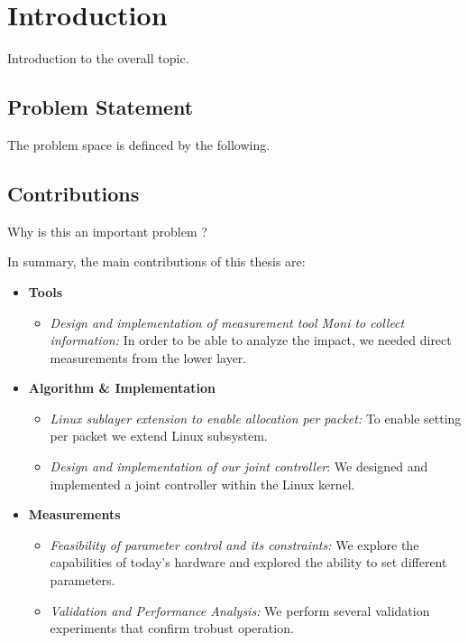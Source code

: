 \chapter{Introduction}
\label{chap:introduction}

Introduction to the overall topic.

\section{Problem Statement}
\label{sec:intro:probstatement}

The problem space is definced by the following.

\section{Contributions}
\label{sec:intro:contrib}


Why is this an important problem ?
%

In summary, the main contributions of this thesis are:

\begin{itemize}
\item{\bf Tools}
  \begin{itemize}
    \item {\it Design and implementation of measurement tool \textit{Moni} to collect information:} In order to be able to analyze the impact, we needed direct measurements from the lower layer.
  \end{itemize}
\item {\bf Algorithm \& Implementation}
 	\begin{itemize}
    	\item {\it Linux sublayer extension to enable allocation per packet:} To enable setting per packet we extend Linux subsystem.
    	\item {\it Design and implementation of our joint controller}: We designed and implemented a joint controller within the Linux kernel.
	\end{itemize}
\item {\bf Measurements}
  \begin{itemize}
      \item {\it Feasibility of parameter control and its constraints:} We explore the capabilities of today's hardware and explored the ability to set different parameters.
	    \item {\it Validation and Performance Analysis:} We perform several validation experiments that confirm trobust operation.
  \end{itemize}
\end{itemize}

